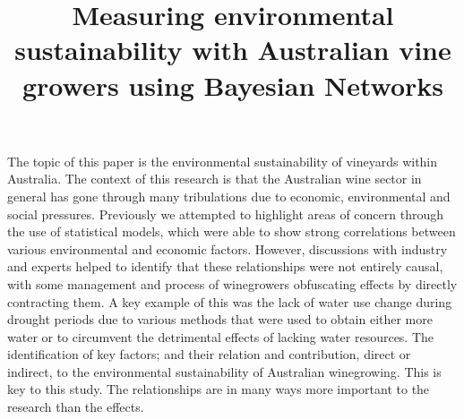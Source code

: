 
The topic of this paper is the environmental sustainability of vineyards within Australia.
The context of this research is that the Australian wine sector in general has gone through many tribulations due to economic, environmental and social pressures. Previously we attempted to highlight areas of concern through the use of statistical models, which were able to show strong correlations between various environmental and economic factors. However, discussions with industry and experts helped to identify that these relationships were not entirely causal, with some management and process of winegrowers obfuscating effects by directly contracting them. A key example of this was the lack of water use change during drought periods due to various methods that were used to obtain either more water or to circumvent the detrimental effects of lacking water resources.
The identification of key factors; and their relation and contribution, direct or indirect, to the environmental sustainability of Australian winegrowing.
This is key to this study. The relationships are in many ways more important to the research than the effects.

%
\title{Measuring environmental sustainability with Australian vine growers using Bayesian Networks}







%

